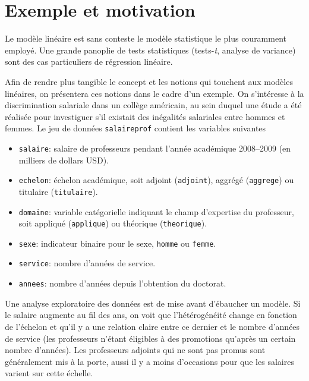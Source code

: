 \documentclass[
  11pt,
  letterpaper,
]{scrbook}
\providecommand{\tightlist}{%
  \setlength{\itemsep}{0pt}\setlength{\parskip}{0pt}}\usepackage{longtable,booktabs,array}
\theoremstyle{definition}
\theoremstyle{remark}
\begin{document}
\hypertarget{exemple-et-motivation}{%
\section{Exemple et motivation}\label{exemple-et-motivation}}

Le modèle linéaire est sans conteste le modèle statistique le plus
couramment employé. Une grande panoplie de tests statistiques
(tests-\emph{t}, analyse de variance) sont des cas particuliers de
régression linéaire.

Afin de rendre plus tangible le concept et les notions qui touchent aux
modèles linéaires, on présentera ces notions dans le cadre d'un exemple.
On s'intéresse à la discrimination salariale dans un collège américain,
au sein duquel une étude a été réalisée pour investiguer s'il existait
des inégalités salariales entre hommes et femmes. Le jeu de données
\texttt{salaireprof} contient les variables suivantes

\begin{itemize}
\tightlist
\item
  \texttt{salaire}: salaire de professeurs pendant l'année académique
  2008--2009 (en milliers de dollars USD).
\item
  \texttt{echelon}: échelon académique, soit adjoint (\texttt{adjoint}),
  aggrégé (\texttt{aggrege}) ou titulaire (\texttt{titulaire}).
\item
  \texttt{domaine}: variable catégorielle indiquant le champ d'expertise
  du professeur, soit appliqué (\texttt{applique}) ou théorique
  (\texttt{theorique}).
\item
  \texttt{sexe}: indicateur binaire pour le sexe, \texttt{homme} ou
  \texttt{femme}.
\item
  \texttt{service}: nombre d'années de service.
\item
  \texttt{annees}: nombre d'années depuis l'obtention du doctorat.
\end{itemize}

Une analyse exploratoire des données est de mise avant d'ébaucher un
modèle. Si le salaire augmente au fil des ans, on voit que
l'hétérogénéité change en fonction de l'échelon et qu'il y a une
relation claire entre ce dernier et le nombre d'années de service (les
professeurs n'étant éligibles à des promotions qu'après un certain
nombre d'années). Les professeurs adjoints qui ne sont pas promus sont
généralement mis à la porte, aussi il y a moins d'occasions pour que les
salaires varient sur cette échelle.
\end{document}
